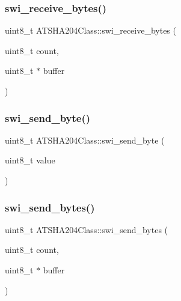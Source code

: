\subsubsection{\texorpdfstring{swi\+\_\+receive\+\_\+bytes()}{swi\_receive\_bytes()}}
{\footnotesize\ttfamily uint8\+\_\+t A\+T\+S\+H\+A204\+Class\+::swi\+\_\+receive\+\_\+bytes (\begin{DoxyParamCaption}\item[{uint8\+\_\+t}]{count,  }\item[{uint8\+\_\+t $\ast$}]{buffer }\end{DoxyParamCaption})\hspace{0.3cm}{\ttfamily [private]}}

\mbox{\label{classATSHA204Class_abe55ac783f1a37777bd09b7fc369ebc9}} 
\subsubsection{\texorpdfstring{swi\+\_\+send\+\_\+byte()}{swi\_send\_byte()}}
{\footnotesize\ttfamily uint8\+\_\+t A\+T\+S\+H\+A204\+Class\+::swi\+\_\+send\+\_\+byte (\begin{DoxyParamCaption}\item[{uint8\+\_\+t}]{value }\end{DoxyParamCaption})\hspace{0.3cm}{\ttfamily [private]}}

\mbox{\label{classATSHA204Class_a0f8c2167d152bbe670d1b1187d7b2897}} 
\subsubsection{\texorpdfstring{swi\+\_\+send\+\_\+bytes()}{swi\_send\_bytes()}}
{\footnotesize\ttfamily uint8\+\_\+t A\+T\+S\+H\+A204\+Class\+::swi\+\_\+send\+\_\+bytes (\begin{DoxyParamCaption}\item[{uint8\+\_\+t}]{count,  }\item[{uint8\+\_\+t $\ast$}]{buffer }\end{DoxyParamCaption})\hspace{0.3cm}{\ttfamily [private]}}

